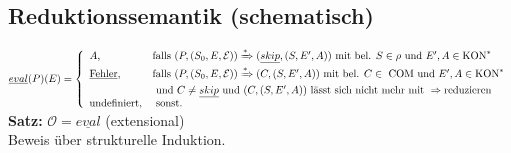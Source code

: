 \subsection{Reduktionssemantik (schematisch)}
$\underline{eval}(P)(E)=\left\lbrace\begin{array}{l l} A\text{,}&\text{falls } (P,(S_0,E,\mathcal{E}))\xRightarrow{*}(\underline{skip},(S,E',A))\text{ mit bel. } S \in \rho \text{ und } E', A \in \text{KON}^*\\
\text{\underline{Fehler}}\text{,}&\text{falls }  (P,(S_0, E, \mathcal{E}))\xRightarrow{*}(C,(S,E',A)) \text{ mit bel. } C \in \text{ COM und } E', A \in \text{KON}^*\\& \text{ und } C \neq \underline{skip} \text{ und } (C, (S, E', A))\text{ lässt sich nicht mehr mit } \Rightarrow \text{reduzieren}\\
\text{undefiniert,}&\text{ sonst.}\\
\end{array}\right.$\\
\textbf{Satz:} $\mathcal{O} = \underline{eval}$ (extensional)\\
Beweis über strukturelle Induktion.